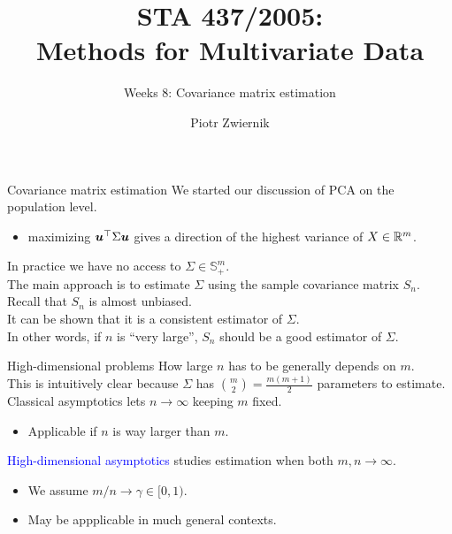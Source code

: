 \documentclass[11pt,handout,aspectratio=169]{beamer}
\title[STA437-Week1]{STA 437/2005: \\ Methods for Multivariate Data}
\subtitle[]{Weeks 8: Covariance matrix estimation}
\author[Piotr Zwiernik]{Piotr Zwiernik}
\institute[UofT]{University of Toronto}
\date{}
\begin{document}
\maketitle

\begin{frame}{Covariance matrix estimation}
	We started our discussion of PCA on the population level. 
	\begin{itemize}
		\item maximizing $\boldsymbol u^\top \Sigma \boldsymbol u$ gives a direction of the highest variance of $X\in \mathbb R^m$. \\[5mm]
	\end{itemize}
	
	In practice we have no access to $\Sigma\in \mathbb S^m_+$.\\[5mm]
	
	The main approach is to estimate $\Sigma$ using the sample covariance matrix $S_n$.\\[5mm]
	
	Recall that $S_n$ is almost unbiased.\\[5mm] 
	It can be shown that it is a consistent estimator of $\Sigma$.\\[5mm]
	In other words, if $n$ is ``very large'', $S_n$ should be a good estimator of $\Sigma$.  
\end{frame}

\begin{frame}{High-dimensional problems}
	How large $n$ has to be generally depends on $m$.\\[5mm]
	This is intuitively clear because $\Sigma$ has $\binom{m}{2}=\tfrac{m(m+1)}{2}$ parameters to estimate.\\[5mm]
\alert{Classical asymptotics} lets $n\to \infty$ keeping $m$ fixed.\begin{itemize}
	\item Applicable if $n$ is way larger than $m$.\\[5mm]
\end{itemize} 
\textcolor{blue}{High-dimensional asymptotics} studies estimation when both $m,n\to \infty$.\begin{itemize}
	\item We assume $m/n\to \gamma\in [0,1)$.
	\item May be appplicable in much general contexts.
\end{itemize}\end{frame}
\end{document}
